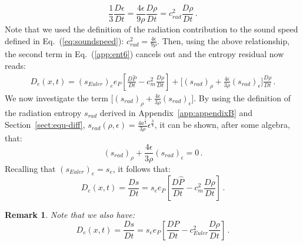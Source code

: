 \documentclass[review]{elsarticle}
\newtheorem{remark}{Remark}[section]
\newcommand{\eqt}[1]{Eq.~(\ref{#1})}                     %
\newcommand{\eqts}[1]{Eqs.~(\ref{#1})}                     %
\newcommand{\sect}[1]{Section~\ref{#1}}                     %
\newcommand{\app}[1]{Appendix~\ref{#1}}                     %
\begin{document}
\begin{appendices}
%
\begin{equation}\label{eq:app7}
\frac{1}{3} \frac{D \epsilon}{D t} =  \frac{4 \epsilon}{9\rho} \frac{D \rho}{D t} = c^2_{rad}\frac{D \rho}{D t} \,.
\end{equation}
%
Note that we used the definition of the radiation contribution to the sound speed defined in \eqt{eq:soundspeed}: $c_{rad}^2 = \frac{4 \epsilon}{9 \rho}$. Then, using the above relationship, the second term in \eqt{app:ent6} cancels out and the entropy residual now reads:
%
\begin{multline}\label{app:ent8}
D_e(x,t) = (s_{Euler})_e e_P\left[ \frac{D \hat{P}}{Dt} - c^2_m \frac{D \rho}{Dt} \right]  +  \Big[ (s_{rad})_\rho +  \frac{4 \epsilon}{3\rho} (s_{rad})_\epsilon\Big]  \frac{D \rho}{Dt} \,.
\end{multline}
%
We now investigate the term $\Big[ (s_{rad})_\rho +  \frac{4 \epsilon}{3\rho} (s_{rad})_\epsilon\Big]$. By using the definition of the radiation entropy $s_{rad}$ derived in \app{app:appendixB} and \sect{sect:equ-diff}, $s_{rad}(\rho, \epsilon) = \frac{4 a^\frac{1}{4}}{3 \rho} \epsilon^\frac{3}{4}$, it can be shown, after some algebra, that:
%
\begin{equation}
(s_{rad})_\rho +  \frac{4 \epsilon}{3\rho} (s_{rad})_\epsilon = 0 \, .\nonumber
\end{equation}
% 
Recalling that $(s_{Euler})_e = s_e$, it follows that:
%
\begin{equation}
D_e(x,t) = \frac{D s}{D t} = s_e e_P\left[ \frac{D \hat{P}}{Dt} - c^2_m \frac{D \rho}{Dt} \right] \, . \nonumber
\end{equation}
% 
\begin{remark}
Note that we also have:
%
\begin{equation}
D_e(x,t) = \frac{D s}{D t} = s_e e_P\left[ \frac{D P}{Dt} - c^2_{Euler} \frac{D \rho}{Dt} \right] \, . \nonumber
\end{equation}
%
\end{remark}
%
%


\end{appendices}
\end{document}
